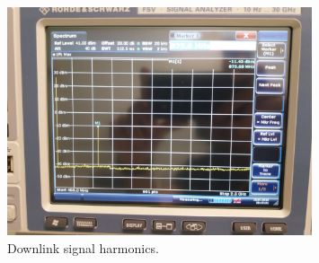 \documentclass[12pt]{book}
\begin{document}
\begin{figure}[H]
    \begin{center}
        \includegraphics[width=0.8\textwidth]{figures/tests/downlink_harmonics.jpg}
        \caption{Downlink signal harmonics.}
        \label{fig:downlink-harmonics}
    \end{center}
\end{figure}




\end{document}
